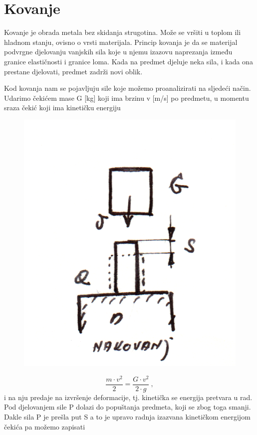 \documentclass[a4paper,12pt]{article}
\numberwithin{figure}{section}
\begin{document}
\section{Kovanje}
Kovanje je obrada metala bez skidanja strugotina. Može se vršiti u toplom ili hladnom stanju, ovisno o vrsti materijala. Princip kovanja je da se materijal podvrgne djelovanju vanjskih sila koje u njemu izazovu naprezanja između granice elastičnosti i granice loma. Kada na predmet djeluje neka sila, i kada ona prestane djelovati, predmet zadrži novi oblik.\par
Kod kovanja nam se pojavljuju sile koje možemo proanalizirati na sljedeći način. Udarimo čekićem mase G [kg] koji ima brzinu v [m/s] po predmetu, u momentu sraza čekić koji ima kinetičku energiju
\begin{figure}[!h]
\centering
\includegraphics[scale=0.15]{image_40-1.png}
\end{figure}
\FloatBarrier
\begin{equation}
\frac{m\cdot v^{2}}{2} = \frac{G\cdot v^{2}}{2 \cdot g}\:,
\end{equation}
i na nju predaje na izvršenje deformacije, tj. kinetička se energija pretvara u rad. Pod  djelovanjem sile P dolazi do popuštanja predmeta, koji se zbog toga smanji. Dakle sila P je prešla put S a to je upravo radnja izazvana kinetičkom energijom čekića pa možemo zapisati
\end{document}
